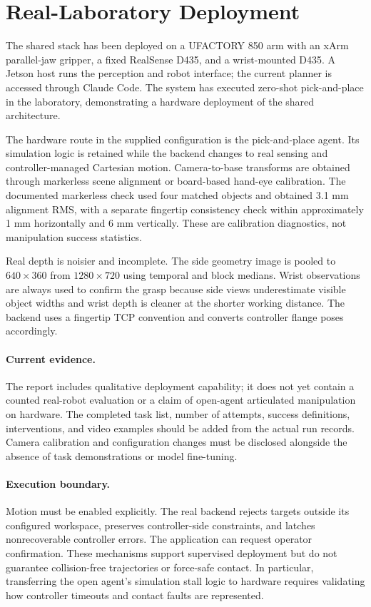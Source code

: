 \section{Real-Laboratory Deployment}
\label{sec:real}

The shared stack has been deployed on a UFACTORY 850 arm with an xArm parallel-jaw gripper, a fixed RealSense D435, and a wrist-mounted D435. A Jetson host runs the perception and robot interface; the current planner is accessed through Claude Code. The system has executed zero-shot pick-and-place in the laboratory, demonstrating a hardware deployment of the shared architecture.

The hardware route in the supplied configuration is the pick-and-place agent. Its simulation logic is retained while the backend changes to real sensing and controller-managed Cartesian motion. Camera-to-base transforms are obtained through markerless scene alignment or board-based hand-eye calibration. The documented markerless check used four matched objects and obtained 3.1 mm alignment RMS, with a separate fingertip consistency check within approximately 1 mm horizontally and 6 mm vertically. These are calibration diagnostics, not manipulation success statistics.

Real depth is noisier and incomplete. The side geometry image is pooled to $640\times360$ from $1280\times720$ using temporal and block medians. Wrist observations are always used to confirm the grasp because side views underestimate visible object widths and wrist depth is cleaner at the shorter working distance. The backend uses a fingertip TCP convention and converts controller flange poses accordingly.

\paragraph{Current evidence.}
The report includes qualitative deployment capability; it does not yet contain a counted real-robot evaluation or a claim of open-agent articulated manipulation on hardware. The completed task list, number of attempts, success definitions, interventions, and video examples should be added from the actual run records. Camera calibration and configuration changes must be disclosed alongside the absence of task demonstrations or model fine-tuning.

\paragraph{Execution boundary.}
Motion must be enabled explicitly. The real backend rejects targets outside its configured workspace, preserves controller-side constraints, and latches nonrecoverable controller errors. The application can request operator confirmation. These mechanisms support supervised deployment but do not guarantee collision-free trajectories or force-safe contact. In particular, transferring the open agent's simulation stall logic to hardware requires validating how controller timeouts and contact faults are represented.
